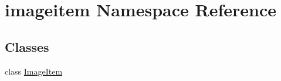 \hypertarget{namespaceimageitem}{}\section{imageitem Namespace Reference}
\label{namespaceimageitem}
\subsection*{Classes}
\begin{DoxyCompactItemize}
\item 
class \hyperlink{classimageitem_1_1ImageItem}{Image\+Item}
\end{DoxyCompactItemize}
